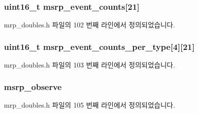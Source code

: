 \subsubsection[{\texorpdfstring{msrp\+\_\+event\+\_\+counts}{msrp_event_counts}}]{\setlength{\rightskip}{0pt plus 5cm}uint16\+\_\+t msrp\+\_\+event\+\_\+counts\mbox{[}21\mbox{]}}\hypertarget{structmrpd__test__state_a023271ecbc0b1e5150fa848b509d35ca}{}\label{structmrpd__test__state_a023271ecbc0b1e5150fa848b509d35ca}


mrp\+\_\+doubles.\+h 파일의 102 번째 라인에서 정의되었습니다.

\subsubsection[{\texorpdfstring{msrp\+\_\+event\+\_\+counts\+\_\+per\+\_\+type}{msrp_event_counts_per_type}}]{\setlength{\rightskip}{0pt plus 5cm}uint16\+\_\+t msrp\+\_\+event\+\_\+counts\+\_\+per\+\_\+type\mbox{[}4\mbox{]}\mbox{[}21\mbox{]}}\hypertarget{structmrpd__test__state_a0765cf7ca7b4f9fc52ddcfd9730a34da}{}\label{structmrpd__test__state_a0765cf7ca7b4f9fc52ddcfd9730a34da}


mrp\+\_\+doubles.\+h 파일의 103 번째 라인에서 정의되었습니다.

\subsubsection[{\texorpdfstring{msrp\+\_\+observe}{msrp_observe}}]{ msrp\+\_\+observe}\hypertarget{structmrpd__test__state_aee209b89e16f5f552ac075ca9a193fa2}{}\label{structmrpd__test__state_aee209b89e16f5f552ac075ca9a193fa2}


mrp\+\_\+doubles.\+h 파일의 105 번째 라인에서 정의되었습니다.

